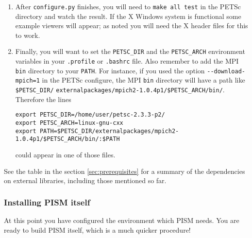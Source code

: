 \documentclass[11pt,final]{amsart}
\begin{document}
\begin{enumerate}
\begin{enumerate}
\item  After \verb|configure.py| finishes, you will need to \verb|make all test| in the PETSc directory and watch the result.  If the X Windows system is functional some example viewers will appear; as noted you will need the X header files for this to work.

\item Finally, you will want to set the \verb|PETSC_DIR| and the \verb|PETSC_ARCH| environment variables in your \verb|.profile| or \verb|.bashrc| file.  Also remember to add the MPI \verb|bin| directory to your \verb|PATH|.  For instance, if you used the option \verb|--download-mpich=1| in the PETSc configure, the MPI \verb|bin| directory will have a path like \verb|$PETSC_DIR/| \verb|externalpackages/mpich2-1.0.4p1/$PETSC_ARCH/bin/|.  Therefore the lines 
\begin{verbatim}
export PETSC_DIR=/home/user/petsc-2.3.3-p2/
export PETSC_ARCH=linux-gnu-cxx
export PATH=$PETSC_DIR/externalpackages/mpich2-1.0.4p1/$PETSC_ARCH/bin/:$PATH
\end{verbatim}
\noindent could appear in one of those files.
\end{enumerate}
\end{enumerate}
\medskip See the table in the section \ref{sec:prerequisites} for a summary of the dependencies on external libraries, including
those mentioned so far.

\subsubsection{Installing PISM itself}
\label{sec:pism-itself}
At this point you have configured the environment which PISM needs.  You are ready to build PISM itself, which is a much quicker procedure!
\end{document}
